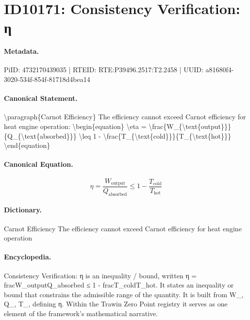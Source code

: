 \section*{ID10171: Consistency Verification: η}
\paragraph{Metadata.}
PiID: 4732170439035 | RTEID: RTE:P39496.2517:T2.2458 | UUID: a81680f4-3020-534f-854f-81718d4bea14

\paragraph{Canonical Statement.}
\textbackslash{}paragraph\{Carnot Efficiency\} The efficiency cannot exceed Carnot efficiency for heat engine operation: \textbackslash{}begin\{equation\} \textbackslash{}eta = \textbackslash{}frac\{W\_\{\textbackslash{}text\{output\}\}\}\{Q\_\{\textbackslash{}text\{absorbed\}\}\} \textbackslash{}leq 1 - \textbackslash{}frac\{T\_\{\textbackslash{}text\{cold\}\}\}\{T\_\{\textbackslash{}text\{hot\}\}\} \textbackslash{}end\{equation\}

\paragraph{Canonical Equation.}
\[
\eta = \frac{W_{\text{output}}}{Q_{\text{absorbed}}} \leq 1 - \frac{T_{\text{cold}}}{T_{\text{hot}}}
\]

\paragraph{Dictionary.}
Carnot Efficiency The efficiency cannot exceed Carnot efficiency for heat engine operation

\paragraph{Encyclopedia.}
Consistency Verification: η is an inequality / bound, written η = fracW\_outputQ\_absorbed ≤ 1 - fracT\_coldT\_hot. It states an inequality or bound that constrains the admissible range of the quantity. It is built from W\_, Q\_, T\_, defining η. Within the Trawin Zero Point registry it serves as one element of the framework's mathematical narrative.

